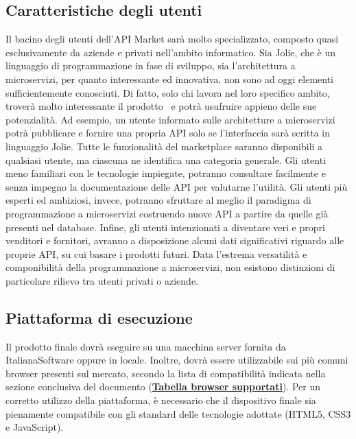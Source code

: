 \subsection{Caratteristiche degli utenti}
Il bacino degli utenti dell'API Market sarà molto specializzato, composto quasi esclusivamente da aziende e privati nell'ambito informatico. Sia Jolie, che è un linguaggio di programmazione in fase di sviluppo, sia l'architettura a microservizi, per quanto interessante ed innovativa, non sono ad oggi elementi sufficientemente conosciuti. Di fatto, solo chi lavora nel loro specifico ambito, troverà molto interessante il prodotto \progetto\ e potrà usufruire appieno delle sue potenzialità. Ad esempio, un utente informato sulle architetture a microservizi potrà pubblicare e fornire una propria API solo se l'interfaccia sarà scritta in linguaggio Jolie. Tutte le funzionalità del marketplace saranno disponibili a qualsiasi utente, ma ciascuna ne identifica una categoria generale. Gli utenti meno familiari con le tecnologie impiegate, potranno consultare facilmente e senza impegno la documentazione delle API per valutarne l'utilità. Gli utenti più esperti ed ambiziosi, invece, potranno sfruttare al meglio il paradigma di programmazione a microservizi costruendo nuove API a partire da quelle già presenti nel database. Infine, gli utenti intenzionati a diventare veri e propri venditori e fornitori, avranno a disposizione alcuni dati significativi riguardo alle proprie API, su cui basare i prodotti futuri. Data l'estrema versatilità e componibilità della programmazione a microservizi, non esistono distinzioni di particolare rilievo tra utenti privati o aziende.

\subsection{Piattaforma di esecuzione}
Il prodotto finale dovrà eseguire su una macchina server fornita da ItalianaSoftware oppure in locale. Inoltre, dovrà essere utilizzabile sui più comuni browser presenti sul mercato, secondo la lista di compatibilità indicata nella sezione conclusiva del documento (\textbf{\hyperref[Tabella-browser-supportati]{Tabella browser supportati}}). Per un corretto utilizzo della piattaforma, è necessario che il dispositivo finale sia pienamente compatibile con gli standard delle tecnologie adottate (HTML5, CSS3 e JavaScript).

